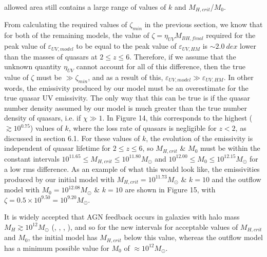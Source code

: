 \documentclass[12pt, twocolumn]{report}%
\begin{document}
\twocolumngrid


\noindent allowed area still contains a large range of values of $k$ and $M_{H,crit}$/$M_0$.\par

From calculating the required values of $\zeta_{min}$ in the previous section, we know that for both of the remaining models, the value of $\zeta=\eta_{UV}M_{BH,final}$ required for the peak value of $\varepsilon_{UV,model}$ to be equal to the peak value of $\varepsilon_{UV,HM}$ is $\sim2.0\:dex$ lower than the masses of quasars at $2\leq z\leq6$. Therefore, if we assume that the unknown quantity $\eta_{UV}$ cannot account for all of this difference, then the true value of $\zeta$ must be $\gg\zeta_{min}$, and as a result of this, $\varepsilon_{UV,model}\gg\varepsilon_{UV,HM}$. In other words, the emissivity produced by our model must be an overestimate for the true quasar UV emissivity. The only way that this can be true is if the quasar number density assumed by our model is much greater than the true number density of quasars, i.e. if $\chi\gg1$. In Figure 14, this corresponds to the highest ($\gtrsim10^{0.75}$) values of $k$, where the loss rate of quasars is negligible for $z<2$, as discussed in section 6.1. For these values of $k$, the evolution of the emissivity is independent of quasar lifetime for $2\leq z\leq6$, so $M_{H,crit}$ \& $M_0$ must be within the constant intervals $10^{11.65}\leq M_{H,crit}\leq10^{11.80}M_\odot$ and $10^{12.00}\leq M_0\leq10^{12.15}M_\odot$ for a low rms difference. As an example of what this would look like, the emissivities produced by our initial model with $M_{H,crit}=10^{11.73}M_\odot$ \& $k=10$ and the outflow model with $M_0=10^{12.08}M_\odot$ \& $k=10$ are shown in Figure 15, with $\zeta=0.5\times10^{9.50}=10^{9.20}M_\odot$.\par

It is widely accepted that AGN feedback occurs in galaxies with halo mass $M_H\gtrsim10^12M_\odot$ (\cite{Ikea}, \cite{Byrne}, \cite{Bassini}, \cite{Somerville}), and so for the new intervals for acceptable values of $M_{H,crit}$ and $M_0$, the initial model has $M_{H,crit}$ below this value, whereas the outflow model has a minimum possible value for $M_0$ of $\approx10^{12}M_\odot$.

\onecolumngrid
\end{document}
